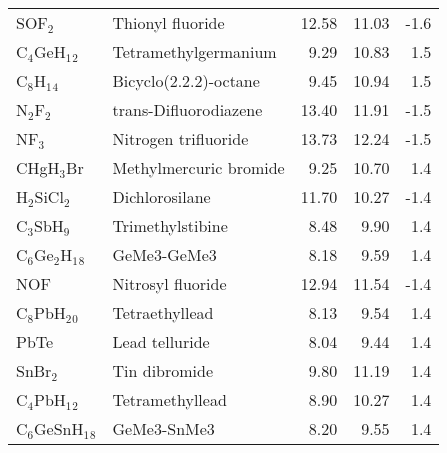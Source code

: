 \begin{table}
\begin{center}
\begin{tabular}{llrrr}
 SOF$_2$              & Thionyl fluoride                       &   12.58   &    11.03   &   -1.6\\
 C$_4$GeH$_1$$_2$     & Tetramethylgermanium                   &    9.29   &    10.83   &    1.5\\
 C$_8$H$_1$$_4$       & Bicyclo(2.2.2)-octane                  &    9.45   &    10.94   &    1.5\\
 N$_2$F$_2$           & trans-Difluorodiazene                  &   13.40   &    11.91   &   -1.5\\
 NF$_3$               & Nitrogen trifluoride                   &   13.73   &    12.24   &   -1.5\\
 CHgH$_3$Br           & Methylmercuric bromide                 &    9.25   &    10.70   &    1.4\\
 H$_2$SiCl$_2$        & Dichlorosilane                         &   11.70   &    10.27   &   -1.4\\
 C$_3$SbH$_9$         & Trimethylstibine                       &    8.48   &     9.90   &    1.4\\
 C$_6$Ge$_2$H$_1$$_8$ & GeMe3-GeMe3                            &    8.18   &     9.59   &    1.4\\
 NOF                  & Nitrosyl fluoride                      &   12.94   &    11.54   &   -1.4\\
 C$_8$PbH$_2$$_0$     & Tetraethyllead                         &    8.13   &     9.54   &    1.4\\
 PbTe                 & Lead telluride                         &    8.04   &     9.44   &    1.4\\
 SnBr$_2$             & Tin dibromide                          &    9.80   &    11.19   &    1.4\\
 C$_4$PbH$_1$$_2$     & Tetramethyllead                        &    8.90   &    10.27   &    1.4\\
 C$_6$GeSnH$_1$$_8$   & GeMe3-SnMe3                            &    8.20   &     9.55   &    1.4\\
\hline
\end{tabular}
\end{center}
\end{table}
